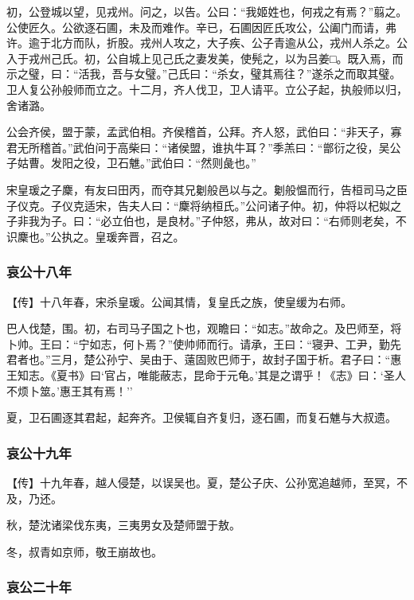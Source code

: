 \documentclass[]{article}
\begin{document}
初，公登城以望，见戎州。问之，以告。公曰：``我姬姓也，何戎之有焉？''翦之。公使匠久。公欲逐石圃，未及而难作。辛已，石圃因匠氏攻公，公阖门而请，弗许。逾于北方而队，折股。戎州人攻之，大子疾、公子青逾从公，戎州人杀之。公入于戎州己氏。初，公自城上见己氏之妻发美，使髡之，以为吕姜□。既入焉，而示之璧，曰：``活我，吾与女璧。''己氏曰：``杀女，璧其焉往？''遂杀之而取其璧。卫人复公孙般师而立之。十二月，齐人伐卫，卫人请平。立公子起，执般师以归，舍诸潞。

公会齐侯，盟于蒙，孟武伯相。齐侯稽首，公拜。齐人怒，武伯曰：``非天子，寡君无所稽首。''武伯问于高柴曰：``诸侯盟，谁执牛耳？''季羔曰：``鄫衍之役，吴公子姑曹。发阳之役，卫石魋。''武伯曰：``然则彘也。''

宋皇瑗之子麇，有友曰田丙，而夺其兄劖般邑以与之。劖般愠而行，告桓司马之臣子仪克。子仪克适宋，告夫人曰：``麇将纳桓氏。''公问诸子仲。初，仲将以杞姒之子非我为子。曰：``必立伯也，是良材。''子仲怒，弗从，故对曰：``右师则老矣，不识麇也。''公执之。皇瑗奔晋，召之。

\hypertarget{header-n3242}{%
\subsubsection{哀公十八年}\label{header-n3242}}

【传】十八年春，宋杀皇瑗。公闻其情，复皇氏之族，使皇缓为右师。

巴人伐楚，围。初，右司马子国之卜也，观瞻曰：``如志。''故命之。及巴师至，将卜帅。王曰：``宁如志，何卜焉？''使帅师而行。请承，王曰：``寝尹、工尹，勤先君者也。''三月，楚公孙宁、吴由于、薳固败巴师于，故封子国于析。君子曰：``惠王知志。《夏书》曰`官占，唯能蔽志，昆命于元龟。'其是之谓乎！《志》曰：`圣人不烦卜筮。'惠王其有焉！''

夏，卫石圃逐其君起，起奔齐。卫侯辄自齐复归，逐石圃，而复石魋与大叔遗。

\hypertarget{header-n3248}{%
\subsubsection{哀公十九年}\label{header-n3248}}

【传】十九年春，越人侵楚，以误吴也。夏，楚公子庆、公孙宽追越师，至冥，不及，乃还。

秋，楚沈诸梁伐东夷，三夷男女及楚师盟于敖。

冬，叔青如京师，敬王崩故也。

\hypertarget{header-n3254}{%
\subsubsection{哀公二十年}\label{header-n3254}}
\end{document}
